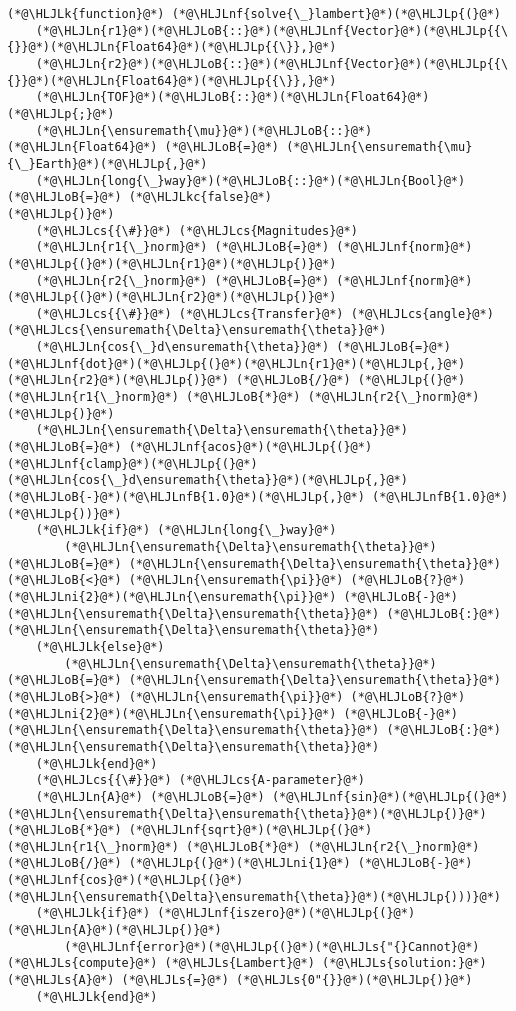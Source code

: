 \documentclass[12pt,a4paper]{article}
\newcommand{\HLJLk}[1]{\textcolor[RGB]{148,91,176}{\textbf{#1}}}
\newcommand{\HLJLkc}[1]{\textcolor[RGB]{59,151,46}{\textit{#1}}}
\newcommand{\HLJLn}[1]{#1}
\newcommand{\HLJLnf}[1]{\textcolor[RGB]{66,102,213}{#1}}
\newcommand{\HLJLs}[1]{\textcolor[RGB]{201,61,57}{#1}}
\newcommand{\HLJLnfB}[1]{\textcolor[RGB]{59,151,46}{#1}}
\newcommand{\HLJLni}[1]{\textcolor[RGB]{59,151,46}{#1}}
\newcommand{\HLJLoB}[1]{\textcolor[RGB]{102,102,102}{\textbf{#1}}}
\newcommand{\HLJLp}[1]{#1}
\newcommand{\HLJLcs}[1]{\textcolor[RGB]{153,153,119}{\textit{#1}}}
\begin{document}
\begin{lstlisting}
(*@\HLJLk{function}@*) (*@\HLJLnf{solve{\_}lambert}@*)(*@\HLJLp{(}@*)
	(*@\HLJLn{r1}@*)(*@\HLJLoB{::}@*)(*@\HLJLnf{Vector}@*)(*@\HLJLp{{\{}}@*)(*@\HLJLn{Float64}@*)(*@\HLJLp{{\}},}@*) 
	(*@\HLJLn{r2}@*)(*@\HLJLoB{::}@*)(*@\HLJLnf{Vector}@*)(*@\HLJLp{{\{}}@*)(*@\HLJLn{Float64}@*)(*@\HLJLp{{\}},}@*) 
	(*@\HLJLn{TOF}@*)(*@\HLJLoB{::}@*)(*@\HLJLn{Float64}@*)(*@\HLJLp{;}@*) 
	(*@\HLJLn{\ensuremath{\mu}}@*)(*@\HLJLoB{::}@*)(*@\HLJLn{Float64}@*) (*@\HLJLoB{=}@*) (*@\HLJLn{\ensuremath{\mu}{\_}Earth}@*)(*@\HLJLp{,}@*) 
	(*@\HLJLn{long{\_}way}@*)(*@\HLJLoB{::}@*)(*@\HLJLn{Bool}@*) (*@\HLJLoB{=}@*) (*@\HLJLkc{false}@*)
(*@\HLJLp{)}@*)
	(*@\HLJLcs{{\#}}@*) (*@\HLJLcs{Magnitudes}@*)
	(*@\HLJLn{r1{\_}norm}@*) (*@\HLJLoB{=}@*) (*@\HLJLnf{norm}@*)(*@\HLJLp{(}@*)(*@\HLJLn{r1}@*)(*@\HLJLp{)}@*)
	(*@\HLJLn{r2{\_}norm}@*) (*@\HLJLoB{=}@*) (*@\HLJLnf{norm}@*)(*@\HLJLp{(}@*)(*@\HLJLn{r2}@*)(*@\HLJLp{)}@*)
	(*@\HLJLcs{{\#}}@*) (*@\HLJLcs{Transfer}@*) (*@\HLJLcs{angle}@*) (*@\HLJLcs{\ensuremath{\Delta}\ensuremath{\theta}}@*)
	(*@\HLJLn{cos{\_}d\ensuremath{\theta}}@*) (*@\HLJLoB{=}@*) (*@\HLJLnf{dot}@*)(*@\HLJLp{(}@*)(*@\HLJLn{r1}@*)(*@\HLJLp{,}@*) (*@\HLJLn{r2}@*)(*@\HLJLp{)}@*) (*@\HLJLoB{/}@*) (*@\HLJLp{(}@*)(*@\HLJLn{r1{\_}norm}@*) (*@\HLJLoB{*}@*) (*@\HLJLn{r2{\_}norm}@*)(*@\HLJLp{)}@*)
	(*@\HLJLn{\ensuremath{\Delta}\ensuremath{\theta}}@*) (*@\HLJLoB{=}@*) (*@\HLJLnf{acos}@*)(*@\HLJLp{(}@*)(*@\HLJLnf{clamp}@*)(*@\HLJLp{(}@*)(*@\HLJLn{cos{\_}d\ensuremath{\theta}}@*)(*@\HLJLp{,}@*) (*@\HLJLoB{-}@*)(*@\HLJLnfB{1.0}@*)(*@\HLJLp{,}@*) (*@\HLJLnfB{1.0}@*)(*@\HLJLp{))}@*)
	(*@\HLJLk{if}@*) (*@\HLJLn{long{\_}way}@*)
		(*@\HLJLn{\ensuremath{\Delta}\ensuremath{\theta}}@*) (*@\HLJLoB{=}@*) (*@\HLJLn{\ensuremath{\Delta}\ensuremath{\theta}}@*) (*@\HLJLoB{<}@*) (*@\HLJLn{\ensuremath{\pi}}@*) (*@\HLJLoB{?}@*) (*@\HLJLni{2}@*)(*@\HLJLn{\ensuremath{\pi}}@*) (*@\HLJLoB{-}@*) (*@\HLJLn{\ensuremath{\Delta}\ensuremath{\theta}}@*) (*@\HLJLoB{:}@*) (*@\HLJLn{\ensuremath{\Delta}\ensuremath{\theta}}@*)
	(*@\HLJLk{else}@*)
		(*@\HLJLn{\ensuremath{\Delta}\ensuremath{\theta}}@*) (*@\HLJLoB{=}@*) (*@\HLJLn{\ensuremath{\Delta}\ensuremath{\theta}}@*) (*@\HLJLoB{>}@*) (*@\HLJLn{\ensuremath{\pi}}@*) (*@\HLJLoB{?}@*) (*@\HLJLni{2}@*)(*@\HLJLn{\ensuremath{\pi}}@*) (*@\HLJLoB{-}@*) (*@\HLJLn{\ensuremath{\Delta}\ensuremath{\theta}}@*) (*@\HLJLoB{:}@*) (*@\HLJLn{\ensuremath{\Delta}\ensuremath{\theta}}@*)
	(*@\HLJLk{end}@*)
	(*@\HLJLcs{{\#}}@*) (*@\HLJLcs{A‐parameter}@*)
	(*@\HLJLn{A}@*) (*@\HLJLoB{=}@*) (*@\HLJLnf{sin}@*)(*@\HLJLp{(}@*)(*@\HLJLn{\ensuremath{\Delta}\ensuremath{\theta}}@*)(*@\HLJLp{)}@*) (*@\HLJLoB{*}@*) (*@\HLJLnf{sqrt}@*)(*@\HLJLp{(}@*)(*@\HLJLn{r1{\_}norm}@*) (*@\HLJLoB{*}@*) (*@\HLJLn{r2{\_}norm}@*) (*@\HLJLoB{/}@*) (*@\HLJLp{(}@*)(*@\HLJLni{1}@*) (*@\HLJLoB{-}@*) (*@\HLJLnf{cos}@*)(*@\HLJLp{(}@*)(*@\HLJLn{\ensuremath{\Delta}\ensuremath{\theta}}@*)(*@\HLJLp{)))}@*)
	(*@\HLJLk{if}@*) (*@\HLJLnf{iszero}@*)(*@\HLJLp{(}@*)(*@\HLJLn{A}@*)(*@\HLJLp{)}@*)
		(*@\HLJLnf{error}@*)(*@\HLJLp{(}@*)(*@\HLJLs{"{}Cannot}@*) (*@\HLJLs{compute}@*) (*@\HLJLs{Lambert}@*) (*@\HLJLs{solution:}@*) (*@\HLJLs{A}@*) (*@\HLJLs{=}@*) (*@\HLJLs{0"{}}@*)(*@\HLJLp{)}@*)
	(*@\HLJLk{end}@*)


\end{lstlisting}
\end{document}
